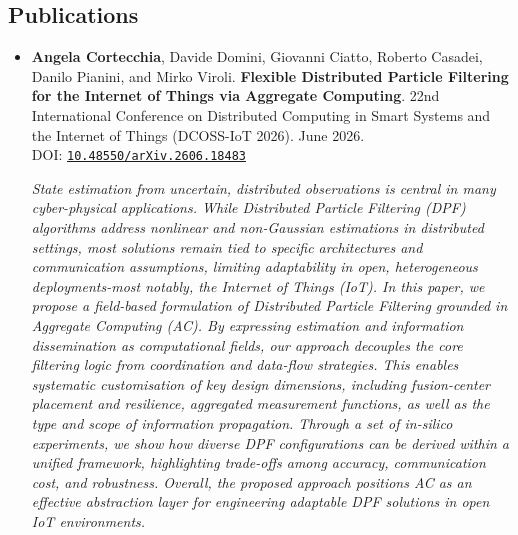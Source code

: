 \documentclass[11pt]{scrartcl}
\newcommand{\pubentry}[6]{%
  \item
  #1.
  \textbf{#2}.
  #3.
  #4.
  \if\relax\detokenize{#6}\relax\else
    \\ DOI: \href{https://doi.org/#6}{\texttt{#6}}%
  \fi

  \begin{sloppypar}
    \vspace{8pt}
    \textit{#5}
    \vspace{8pt}
  \end{sloppypar}
}
\newenvironment{publications}
  {%
    \subsection*{Publications}
    \begin{itemize}
  }
  {%
    \end{itemize}
  }
\begin{document}
\begin{publications}
  \pubentry
  {\textbf{Angela Cortecchia}, Davide Domini, Giovanni Ciatto, Roberto Casadei, Danilo Pianini, and Mirko Viroli}
  {Flexible Distributed Particle Filtering for the Internet of Things via Aggregate Computing}
  {22nd International Conference on Distributed Computing in Smart Systems and the Internet of Things (DCOSS-IoT 2026)}
  {June 2026}
  {State estimation from uncertain, distributed observations is central in many cyber-physical applications. While Distributed Particle Filtering (DPF) algorithms address nonlinear and non-Gaussian estimations in distributed settings, most solutions remain tied to specific architectures and communication assumptions, limiting adaptability in open, heterogeneous deployments-most notably, the Internet of Things (IoT). In this paper, we propose a field-based formulation of Distributed Particle Filtering grounded in Aggregate Computing (AC). By expressing estimation and information dissemination as computational fields, our approach decouples the core filtering logic from coordination and data-flow strategies. This enables systematic customisation of key design dimensions, including fusion-center placement and resilience, aggregated measurement functions, as well as the type and scope of information propagation. Through a set of in-silico experiments, we show how diverse DPF configurations can be derived within a unified framework, highlighting trade-offs among accuracy, communication cost, and robustness. Overall, the proposed approach positions AC as an effective abstraction layer for engineering adaptable DPF solutions in open IoT environments.}
  {10.48550/arXiv.2606.18483}


\end{publications}
\end{document}
